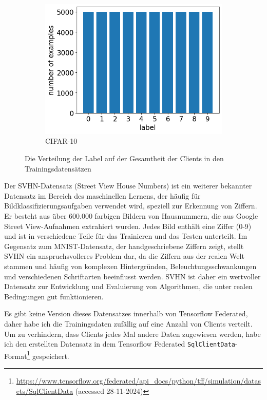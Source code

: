 \begin{figure}[tb]
\begin{subfigure}{0.32\textwidth}
		\includegraphics[width=\textwidth]{Bilder/cifar_label_distribution.png}
		\caption{CIFAR-10}
	\end{subfigure}
	\caption{Die Verteilung der Label auf der Gesamtheit der Clients in den Trainingsdatensätzen}
	\label{fig:label-distribution-all}
\end{figure}

Der SVHN-Datensatz (Street View House Numbers) ist ein weiterer bekannter Datensatz im Bereich des maschinellen Lernens, der häufig für Bildklassifizierungsaufgaben verwendet wird, speziell zur Erkennung von Ziffern. Er besteht aus über 600.000 farbigen Bildern von Hausnummern, die aus Google Street View-Aufnahmen extrahiert wurden. Jedes Bild enthält eine Ziffer (0-9) und ist in verschiedene Teile für das Trainieren und das Testen unterteilt. Im Gegensatz zum MNIST-Datensatz, der handgeschriebene Ziffern zeigt, stellt SVHN ein anspruchsvolleres Problem dar, da die Ziffern aus der realen Welt stammen und häufig von komplexen Hintergründen, Beleuchtungsschwankungen und verschiedenen Schriftarten beeinflusst werden. SVHN ist daher ein wertvoller Datensatz zur Entwicklung und Evaluierung von Algorithmen, die unter realen Bedingungen gut funktionieren.

Es gibt keine Version dieses Datensatzes innerhalb von Tensorflow Federated, daher habe ich die Trainingsdaten zufällig auf eine Anzahl von Clients verteilt. Um zu verhindern, dass Clients jedes Mal andere Daten zugewiesen werden, habe ich den erstellten Datensatz in dem Tensorflow Federated \texttt{SqlClientData}-Format\footnote{\url{https://www.tensorflow.org/federated/api_docs/python/tff/simulation/datasets/SqlClientData} (accessed 28-11-2024)} gespeichert.

